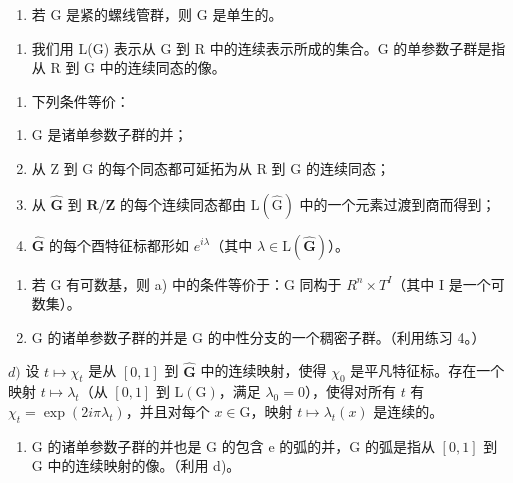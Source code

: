 \begin{enumerate}
\def\labelenumi{\alph{enumi})}
\setcounter{enumi}{4}
\tightlist
\item
  若 G 是紧的螺线管群，则 G 是单生的。
\end{enumerate}

\begin{enumerate}
\def\labelenumi{\arabic{enumi})}
\setcounter{enumi}{10}
\tightlist
\item
  我们用 L(G) 表示从 G 到 R 中的连续表示所成的集合。G 的单参数子群是指从 R 到 G 中的连续同态的像。
\end{enumerate}

\begin{enumerate}
\def\labelenumi{\alph{enumi})}
\tightlist
\item
  下列条件等价：
\end{enumerate}

\begin{enumerate}
\def\labelenumi{(\roman{enumi})}
\item
  G 是诸单参数子群的并；
\item
  从 Z 到 G 的每个同态都可延拓为从 R 到 G 的连续同态；
\item
  从 \(\widehat{\mathbf{G}}\) 到 \(\mathbf{R} / \mathbf{Z}\) 的每个连续同态都由 \(\mathrm{L}(\widehat{\mathrm{G}})\) 中的一个元素过渡到商而得到；
\item
  \(\widehat{\mathbf{G}}\) 的每个酉特征标都形如 \(e^{i\lambda}\)（其中 \(\lambda \in \mathrm{L}(\widehat{\mathbf{G}})\)）。
\end{enumerate}

\begin{enumerate}
\def\labelenumi{\alph{enumi})}
\setcounter{enumi}{1}
\item
  若 G 有可数基，则 a) 中的条件等价于：G 同构于 \(R^{n} \times T^{I}\)（其中 I 是一个可数集）。
\item
  G 的诸单参数子群的并是 G 的中性分支的一个稠密子群。（利用练习 4。）
\end{enumerate}

\(d)\) 设 \(t \mapsto \chi_t\) 是从 \([0,1]\) 到 \(\widehat{\mathbf{G}}\) 中的连续映射，使得 \(\chi_0\) 是平凡特征标。存在一个映射 \(t \mapsto \lambda_t\)（从 \([0,1]\) 到 \(\mathrm{L}(\mathrm{G})\)，满足 \(\lambda_0 = 0\)），使得对所有 \(t\) 有 \(\chi_t = \exp(2i\pi\lambda_t)\)，并且对每个 \(x \in \mathrm{G}\)，映射 \(t \mapsto \lambda_t(x)\) 是连续的。

\begin{enumerate}
\def\labelenumi{\alph{enumi})}
\setcounter{enumi}{4}
\tightlist
\item
  G 的诸单参数子群的并也是 G 的包含 e 的弧的并，G 的弧是指从 \([0,1]\) 到 G 中的连续映射的像。（利用 d)。
\end{enumerate}

